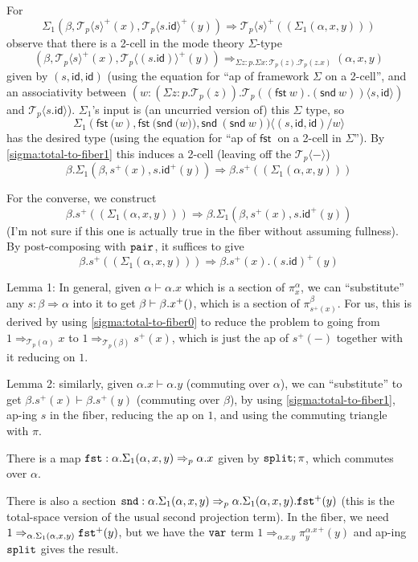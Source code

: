 \documentclass[10pt]{article}
\theoremstyle{definition}
\newcommand\dsd[1]{\ensuremath{\mathsf{#1}}}
\newcommand{\tcell}{\Rightarrow}
\newcommand{\app}[2]{\ensuremath{#1 \: #2}}
\newcommand{\fst}[1]{\app{\dsd{fst}}{#1}}
\newcommand{\snd}[1]{\app{\dsd{snd}}{#1}}
\newcommand{\id}{\mathsf{id}}
\newcommand\TrPlus[2]{\ensuremath{{#1}^+(#2)}}
\newcommand\El[2]{\mathcal{T}_{#1}(#2)}
\newcommand\ApEl[2]{\mathcal{T}_{#1}\langle#2\rangle}
\newcommand\ap[2]{\ensuremath{#1 \langle #2 \rangle }}
\begin{document}
\begin{enumerate}
  For 
  \[
  \Sigma_1(\beta,\TrPlus{\ApEl{p}{s}}{x}, \TrPlus{\ApEl{p}{s.\id}}{y}) \tcell \TrPlus{\ApEl{p}{s}}{(\Sigma_1(\alpha,x,y))} 
  \]
  observe that there is a 2-cell in the mode theory $\Sigma$-type
  \[
  (\beta,\TrPlus{\ApEl{p}{s}}{x}, \TrPlus{\ApEl{p}{(s . \id)}}{y}) \tcell_{\Sigma z:p.\Sigma x:\El{p}{z}.\El{p}{z.x}} (\alpha,x,y)
  \]
  given by $(s, \id, \id)$ (using the equation for ``ap of framework
  $\Sigma$ on a 2-cell'', and an associativity between $(\ap{w:(\Sigma
    z:p.\El{p}{z}).\El{p}{(\fst w).(\snd w)}}{s , \id})$ and
  $\ApEl{p}{s.\id}$).  $\Sigma_1$'s input is (an uncurried version of)
  this $\Sigma$ type, so
  \[
  \ap{\Sigma_1 (\fst(w), \fst({\snd (w)}), \snd{(\snd w)})}{(s, \id, \id)/w}
  \]
  has the desired type (using the equation for ``ap of \fst{} on a
  2-cell in $\Sigma$'').
  By \ref{sigma:total-to-fiber1} this induces a 2-cell (leaving off the $\ApEl{p}{-}$)
  \[
  \beta.\Sigma_1(\beta,\TrPlus{s}{x}, \TrPlus{s.\id}{y}) \tcell \beta.\TrPlus{s}{(\Sigma_1(\alpha,x,y))} 
  \]

  For the converse, we construct 
  \[
  \beta.\TrPlus{s}{(\Sigma_1(\alpha,x,y))} \tcell \beta.\Sigma_1(\beta,\TrPlus{s}{x}, \TrPlus{s.\id}{y}) 
  \]
  (I'm not sure if this one is actually true in the fiber without
  assuming fullness).
  By post-composing with $\mathtt{pair}$, it suffices to give 
  \[
  \beta.\TrPlus{s}{(\Sigma_1(\alpha,x,y))} \tcell \beta.\TrPlus{s}{x}.\TrPlus{(s.\id)}{y}
  \]

  Lemma 1: In general, given $\alpha \vdash \alpha.x$ which is a section
  of $\pi^\alpha_x$, we can ``substitute'' any $s : \beta \tcell \alpha$
  into it to get $\beta \vdash \beta.\TrPlus{x}$, which is a section of
  $\pi^\beta_{\TrPlus{s}{x}}$.  For us, this is derived by using
  \ref{sigma:total-to-fiber0} to reduce the problem to going from $1
  \tcell_{\El{p}{\alpha}} x$ to $1 \tcell_{\El{p}{\beta}}
  \TrPlus{s}{x}$, which is just the ap of ${\TrPlus{s}{-}}$ together
  with it reducing on $1$.

  Lemma 2: similarly, given $\alpha.x \vdash \alpha.y$ (commuting over
  $\alpha$), we can ``substitute'' to get $\beta.\TrPlus{s}{x} \vdash
  \beta.\TrPlus{s}{y}$ (commuting over $\beta$), by using
  \ref{sigma:total-to-fiber1}, ap-ing $s$ in the fiber, reducing the ap
  on $1$, and using the commuting triangle with $\pi$.

  There is a map $\mtt{fst} : \alpha.\Sigma_1(\alpha,x,y) \tcell_p
  \alpha.x$ given by $\mathtt{split};\pi$, which commutes over $\alpha$.

  There is also a section $\mtt{snd} : \alpha.\Sigma_1(\alpha,x,y)
  \tcell_p \alpha.\Sigma_1(\alpha,x,y).\TrPlus{\mtt{fst}}{y}$ (this is
  the total-space version of the usual second projection term).  In the
  fiber, we need $1 \tcell_{\alpha.\Sigma_1(\alpha,x,y)}
  \TrPlus{\mtt{fst}}{y}$, but we have the $\mathtt{var}$ term $1
  \tcell_{\alpha.x.y} \TrPlus{\pi^{\alpha.x}_y}{y}$ and ap-ing
  $\mathtt{split}$ gives the result.
  

\end{enumerate}
\end{document}
